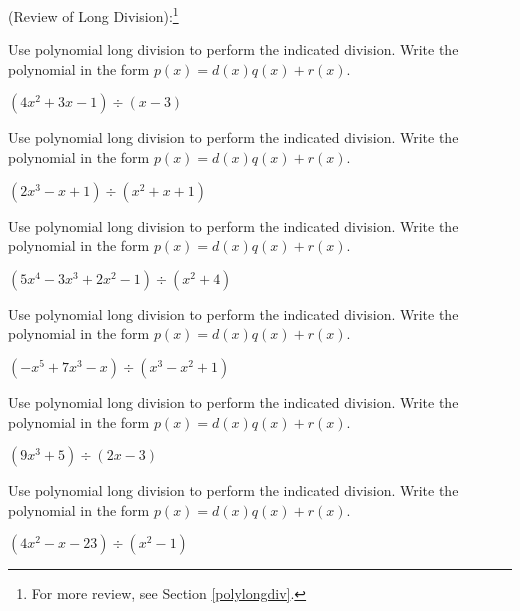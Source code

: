 \documentclass{ximera}
\begin{document}
	\author{Stitz-Zeager}


(Review of Long Division):\footnote{For more review, see Section \ref{polylongdiv}.}  

\begin{problem}\label{longpolydivreviewfirst}
Use polynomial long division to perform the indicated division.  Write the polynomial in the form $p(x) = d(x)q(x) + r(x)$.

$\left(4x^2+3x-1 \right) \div (x-3)$ 
\end{problem}

\begin{problem}
Use polynomial long division to perform the indicated division.  Write the polynomial in the form $p(x) = d(x)q(x) + r(x)$.

$\left(2x^3-x+1 \right) \div \left(x^{2} +x+1 \right)$ 
\end{problem}

\begin{problem}
Use polynomial long division to perform the indicated division.  Write the polynomial in the form $p(x) = d(x)q(x) + r(x)$.

$\left(5x^{4} - 3x^{3} + 2x^{2} - 1 \right) \div \left(x^{2} + 4 \right)$ 
\end{problem}

\begin{problem}
Use polynomial long division to perform the indicated division.  Write the polynomial in the form $p(x) = d(x)q(x) + r(x)$.

$\left(-x^{5} + 7x^{3} - x \right) \div \left(x^{3} - x^{2} + 1 \right)$ 
\end{problem} 

\begin{problem}
Use polynomial long division to perform the indicated division.  Write the polynomial in the form $p(x) = d(x)q(x) + r(x)$.

$\left(9x^{3} + 5 \right) \div \left(2x - 3 \right)$
\end{problem} 

\begin{problem}\label{longpolydivreviewlast}
Use polynomial long division to perform the indicated division.  Write the polynomial in the form $p(x) = d(x)q(x) + r(x)$.

$\left(4x^2 - x - 23 \right) \div \left(x^{2} - 1 \right)$ 
\end{problem}  
\end{document}
